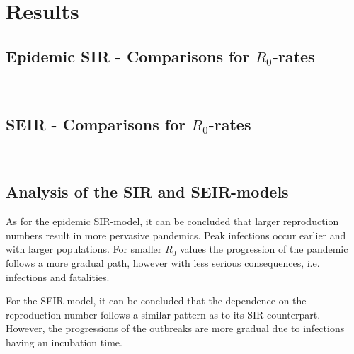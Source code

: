 \documentclass[12pt]{article}
\begin{document}
\section{Results}
\subsection{Epidemic SIR - Comparisons for $R_0$-rates}
\begin{figure*}[ht!]
\begin{center}
   \\
   \caption{\label{workflow} (a) $R_0 = 2$, $\gamma = 1/18$ 
   (b) $R_0 = 4$, $\gamma = 1/18$}
\end{center}
\end{figure*}
\subsection{SEIR - Comparisons for $R_0$-rates}
\begin{figure*}[ht!]
\begin{center}
   \\
   \caption{\label{workflow} (a) $R_0 = 2$, $\alpha = 1/5.2$, 
   $\gamma = 1/18$ (b) $R_0 = 4$, $\alpha = 1/5.2$, $\gamma = 1/18$}
\end{center}
\end{figure*}
\subsection{Analysis of the SIR and SEIR-models}
As for the epidemic SIR-model, it can be concluded that larger 
reproduction numbers result in more pervasive pandemics. Peak 
infections occur earlier and with larger populations. 
For smaller $R_0$ values the progression of the pandemic follows 
a more gradual path, however with less serious consequences, 
i.e. infections and fatalities. 

For the SEIR-model, it can be concluded that the dependence 
on the reproduction number follows a similar pattern as to 
its SIR counterpart. However, the progressions of the outbreaks 
are more gradual due to infections having an incubation time.
\end{document}
